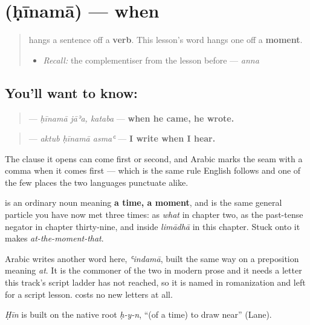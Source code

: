 \section[\texorpdfstring{\ar{حينما} (ḥīnamā)}{حينما (ḥīnamā)}]{ (ḥīnamā) — when}

\label{lesson:AR-C40-hinama}



\begin{quote}
\textbf{} hangs a sentence off a \textbf{verb}. This lesson's word hangs one off a \textbf{moment}.

\begin{itemize}
\raggedright
  \item \emph{Recall:} the complementiser from the lesson before — \emph{anna}
\end{itemize}
\end{quote}

\subsection*{You'll want to know: }
\begin{quote}
\textbf{  } — \emph{ḥīnamā jāʾa, kataba} — \textbf{when he came, he wrote.}
\end{quote}

\begin{quote}
\textbf{  } — \emph{aktub ḥīnamā asmaʿ} — \textbf{I write when I hear.}
\end{quote}

The clause it opens can come first or second, and Arabic marks the seam with a comma when it comes first — which is the same rule English follows and one of the few places the two languages punctuate alike.

\begin{cousinweb}
\textbf{} is an ordinary noun meaning \textbf{a time, a moment}, and \textbf{} is the same general particle you have now met three times: as \emph{what} in chapter two, as the past-tense negator in chapter thirty-nine, and inside \emph{limādhā} in this chapter. Stuck onto \textbf{} it makes \emph{at-the-moment-that}.

Arabic writes another word here, \emph{ʿindamā}, built the same way on a preposition meaning \emph{at}. It is the commoner of the two in modern prose and it needs a letter this track's script ladder has not reached, so it is named in romanization and left for a script lesson. \textbf{} costs no new letters at all.

\emph{Ḥīn} is built on the native root \emph{ḥ-y-n}, \textquotedblleft{}(of a time) to draw near\textquotedblright{} (Lane).
\end{cousinweb}

